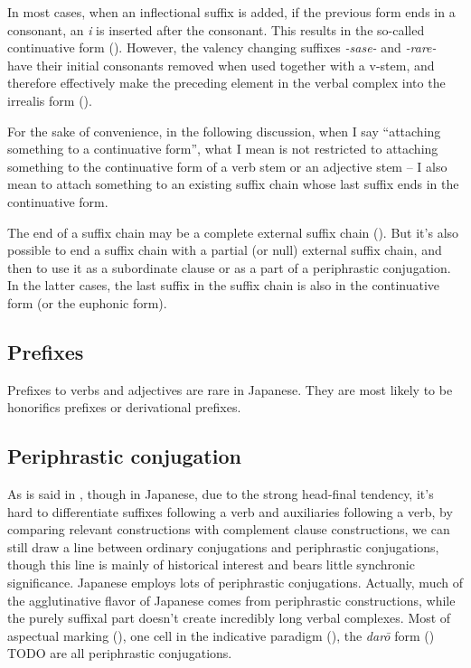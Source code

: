 \documentclass[UTF8, a4paper, oneside, scheme=plain]{ctexrep}
\newcommand{\corpus}[1]{\emph{#1}}
\begin{document}
In most cases,
when an inflectional suffix is added,
if the previous form ends in a consonant,
an \corpus{i} is inserted after the consonant.
This results in the so-called continuative form ().
However, the valency changing suffixes \corpus{-sase-} and \corpus{-rare-}
have their initial consonants removed when used together with a v-stem,
and therefore effectively make the preceding element in the verbal complex into the irrealis form 
().

For the sake of convenience,
in the following discussion,
when I say ``attaching something to a continuative form'',
what I mean is not restricted to 
attaching something to the continuative form of a verb stem or an adjective stem 
-- I also mean to attach something to an existing suffix chain 
whose last suffix ends in the continuative form.

The end of a suffix chain may be a complete external suffix chain 
().
But it's also possible to end a suffix chain with a partial (or null) external suffix chain,
and then to use it as a subordinate clause or as a part of a periphrastic conjugation.
In the latter cases, 
the last suffix in the suffix chain is also in the continuative form
(or the euphonic form).

\subsection{Prefixes}\label{sec:prefixes}

Prefixes to verbs and adjectives are rare in Japanese.
They are most likely to be honorifics prefixes or derivational prefixes.

\subsection{Periphrastic conjugation}\label{sec:periphrastic}

As is said in ,
though in Japanese, 
due to the strong head-final tendency,
it's hard to differentiate
suffixes following a verb and auxiliaries following a verb,
by comparing relevant constructions with complement clause constructions, 
we can still draw a line between ordinary conjugations and periphrastic conjugations,
though this line is mainly of historical interest and bears little synchronic significance.
Japanese employs lots of periphrastic conjugations.
Actually, much of the agglutinative flavor of Japanese comes from periphrastic constructions,
while the purely suffixal part doesn't create incredibly long verbal complexes.
Most of aspectual marking (), 
one cell in the indicative paradigm (), 
the \corpus{{dar\={o}}} form () TODO 
are all periphrastic conjugations.
\end{document}
